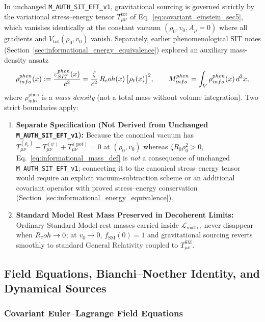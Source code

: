 In unchanged \texttt{M\_AUTH\_SIT\_EFT\_v1}, gravitational sourcing is governed strictly by the variational stress--energy tensor $T_{\mu\nu}^{\mathrm{tot}}$ of Eq.~\eqref{eq:covariant_einstein_sec5}, which vanishes identically at the constant vacuum $(\rho_0, v_0, A_\mu = 0)$ where all gradients and $V_{\mathrm{tot}}(\rho_0, v_0)$ vanish. Separately, earlier phenomenological SIT notes (Section~\ref{sec:informational_energy_equivalence}) explored an auxiliary mass-density ansatz
\begin{equation}
\rho_{info}^{phen}(x) := \frac{\varepsilon_{SIT}^{phen}(x)}{c^2} = \frac{\zeta}{c^2}\,R_coh(x)\,\bigl[\rho_t(x)\bigr]^2,
\qquad
M_{info}^{phen} = \int_{V} \rho_{info}^{phen}(x)\,d^3x,
\label{eq:informational_mass_def}
\end{equation}
where $\rho_{\mathrm{info}}^{\mathrm{phen}}$ is a \emph{mass density} (not a total mass without volume integration). Two strict boundaries apply:
\begin{enumerate}[leftmargin=2em]
  \item \textbf{Separate Specification (Not Derived from Unchanged \texttt{M\_AUTH\_SIT\_EFT\_v1}):} Because the canonical vacuum has $T_{\mu\nu}^{(\rho_t)} + T_{\mu\nu}^{(\psi)} + T_{\mu\nu}^{(\mathrm{pot})} = 0$ at $(\rho_0, v_0)$ whereas $\zeta R_0 \rho_0^2 > 0$, Eq.~\eqref{eq:informational_mass_def} is \emph{not} a consequence of unchanged \texttt{M\_AUTH\_SIT\_EFT\_v1}; connecting it to the canonical stress--energy tensor would require an explicit vacuum-subtraction scheme or an additional covariant operator with proved stress--energy conservation (Section~\ref{sec:informational_energy_equivalence}).
  \item \textbf{Standard Model Rest Mass Preserved in Decoherent Limits:} Ordinary Standard Model rest masses carried inside $\mathcal{L}_{\mathrm{matter}}$ never disappear when $R_coh \to 0$; at $v_0 \to 0$, $f_{\mathrm{SM}}(0) = 1$ and gravitational sourcing reverts smoothly to standard General Relativity coupled to $T_{\mu\nu}^{\mathrm{SM}}$.
\end{enumerate}

\subsection{Field Equations, Bianchi--Noether Identity, and Dynamical Sources}
\label{sec:stress-energy}

\subsubsection{Covariant Euler--Lagrange Field Equations}

